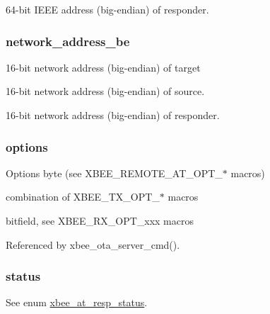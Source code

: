 64-\/bit I\-E\-E\-E address (big-\/endian) of responder. \hypertarget{group__xbee__atcmd_ga73d48563eb05cd5fcc4add79d226a3b8}{
\subsubsection[{network\-\_\-address\-\_\-be}]{ network\-\_\-address\-\_\-be}}\label{group__xbee__atcmd_ga73d48563eb05cd5fcc4add79d226a3b8}


16-\/bit network address (big-\/endian) of target 

16-\/bit network address (big-\/endian) of source.

16-\/bit network address (big-\/endian) of responder. \hypertarget{group__xbee__atcmd_gaace3d640c8d449b8db1162993d259d3f}{
\subsubsection[{options}]{ options}}\label{group__xbee__atcmd_gaace3d640c8d449b8db1162993d259d3f}


Options byte (see X\-B\-E\-E\-\_\-\-R\-E\-M\-O\-T\-E\-\_\-\-A\-T\-\_\-\-O\-P\-T\-\_\-$\ast$ macros) 

combination of X\-B\-E\-E\-\_\-\-T\-X\-\_\-\-O\-P\-T\-\_\-$\ast$ macros

bitfield, see X\-B\-E\-E\-\_\-\-R\-X\-\_\-\-O\-P\-T\-\_\-xxx macros 

Referenced by xbee\-\_\-ota\-\_\-server\-\_\-cmd().

\hypertarget{group__xbee__atcmd_gade818037fd6c985038ff29656089758d}{
\subsubsection[{status}]{ status}}\label{group__xbee__atcmd_gade818037fd6c985038ff29656089758d}


See enum \hyperlink{group__xbee__atcmd_gac6a27f1b1ee32b75b6f966afbb347f22}{xbee\-\_\-at\-\_\-resp\-\_\-status}. 

